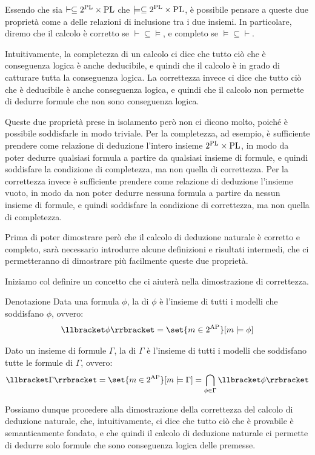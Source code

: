 Essendo che sia \(\vdash \subseteq 2^{\operatorname{PL}}\times\operatorname{PL}\) che \(\models \subseteq 2^{\operatorname{PL}}\times\operatorname{PL}\), è possibile pensare a queste due proprietà come a delle relazioni di inclusione tra i due insiemi. In particolare, diremo che il calcolo è corretto se \(\vdash \subseteq \models\), e completo se \(\models \subseteq \vdash\).

Intuitivamente, la completezza di un calcolo ci dice che tutto ciò che è conseguenza logica è anche deducibile, e quindi che il calcolo è in grado di catturare tutta la conseguenza logica. La correttezza invece ci dice che tutto ciò che è deducibile è anche conseguenza logica, e quindi che il calcolo non permette di dedurre formule che non sono conseguenza logica.

Queste due proprietà prese in isolamento però non ci dicono molto, poiché è possibile soddisfarle in modo triviale. Per la completezza, ad esempio, è sufficiente prendere come relazione di deduzione l'intero insieme \(2^{\operatorname{PL}}\times\operatorname{PL}\), in modo da poter dedurre qualsiasi formula a partire da qualsiasi insieme di formule, e quindi soddisfare la condizione di completezza, ma non quella di correttezza. Per la correttezza invece è sufficiente prendere come relazione di deduzione l'insieme vuoto, in modo da non poter dedurre nessuna formula a partire da nessun insieme di formule, e quindi soddisfare la condizione di correttezza, ma non quella di completezza.

Prima di poter dimostrare però che il calcolo di deduzione naturale è corretto e completo, sarà necessario introdurre alcune definizioni e risultati intermedi, che ci permetteranno di dimostrare più facilmente queste due proprietà.

Iniziamo col definire un concetto che ci aiuterà nella dimostrazione di correttezza.

\begin{definition}{Denotazione}
  Data una formula \(\phi\), la  di \(\phi\) è l'insieme di tutti i modelli che soddisfano \(\phi\), ovvero:
  \[\den{\phi} = \set{m \in 2^{\AP}}[ m \models \phi]\]

  Dato un insieme di formule \(\Gamma\), la  di \(\Gamma\) è l'insieme di tutti i modelli che soddisfano tutte le formule di \(\Gamma\), ovvero:
  \[\den{\Gamma} = \set{m \in 2^{\AP}}[ m \models \Gamma] = \bigcap_{\phi \in \Gamma} \den{\phi}\]
\end{definition}

Possiamo dunque procedere alla dimostrazione della correttezza del calcolo di deduzione naturale, che, intuitivamente, ci dice che tutto ciò che è provabile è semanticamente fondato, e che quindi il calcolo di deduzione naturale ci permette di dedurre solo formule che sono conseguenza logica delle premesse.

